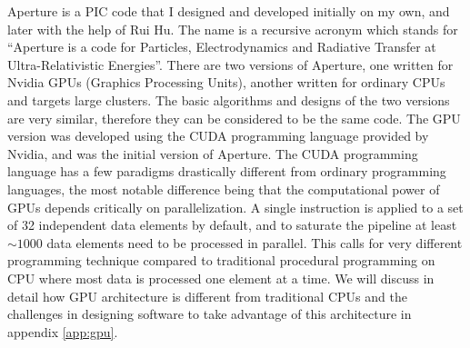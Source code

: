 Aperture is a PIC code that I designed and developed initially on my own, and
later with the help of Rui Hu. The name is a recursive acronym which stands for
``Aperture is a code for Particles, Electrodynamics and Radiative Transfer at
Ultra-Relativistic Energies''. There are two versions of Aperture, one written
for Nvidia GPUs (Graphics Processing Units), another written for ordinary CPUs
and targets large clusters. The basic algorithms and designs of the two versions
are very similar, therefore they can be considered to be the same code. The GPU
version was developed using the CUDA programming language provided by Nvidia,
and was the initial version of Aperture. The CUDA programming language has a few
paradigms drastically different from ordinary programming languages, the most
notable difference being that the computational power of GPUs depends critically
on parallelization. A single instruction is applied to a set of 32 independent
data elements by default, and to saturate the pipeline at least $\sim 1000$ data
elements need to be processed in parallel. This calls for very different
programming technique compared to traditional procedural programming on CPU
where most data is processed one element at a time. We will discuss in detail
how GPU architecture is different from traditional CPUs and the challenges in
designing software to take advantage of this architecture in appendix
\ref{app:gpu}.

